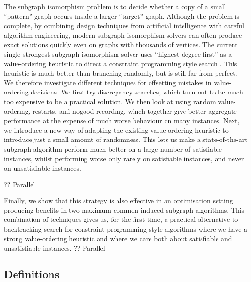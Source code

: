 \documentclass[runningheads]{llncs}
\newcommand{\neighbourhood}{\operatorname{N}}
\newcommand{\vertexset}{\operatorname{V}}
\newcommand{\citet}[2]{#1\cite{#2}}
\begin{document}
The subgraph isomorphism problem is to decide whether a copy of a small ``pattern'' graph occurs
inside a larger ``target'' graph. Although the problem is \NP-complete, by combining design techniques from
artificial intelligence with careful algorithm engineering, modern subgraph isomorphism solvers can
often produce exact solutions quickly even on graphs with thousands of vertices. The current single
strongest subgraph isomorphism solver uses ``highest degree first'' as a value-ordering heuristic to
direct a constraint programming style search
\cite{DBLP:conf/cp/McCreeshP15,DBLP:conf/lion/KotthoffMS16,DBLP:journals/jair/McCreeshPST18}. This
heuristic is much better than branching randomly, but is still far from perfect. We therefore
investigate different techniques for offsetting mistakes in value-ordering decisions. We first try
discrepancy searches, which turn out to be much too expensive to be a practical solution. We then
look at using random value-ordering, restarts, and nogood recording, which together give better
aggregate performance at the expense of much worse behaviour on many instances. Next, we introduce a
new way of adapting the existing value-ordering heuristic to introduce just a small amount of
randomness.  This lets us make a state-of-the-art subgraph algorithm perform much better
on a large number of satisfiable instances, whilst performing worse only rarely on satisfiable
instances, and never on unsatisfiable instances.

?? Parallel

Finally, we show that this strategy is also effective in an optimisation setting, producing benefits
in two maximum common induced subgraph algorithms. This combination of techniques gives us, for the
first time, a practical alternative to backtracking search for constraint programming style
algorithms where we have a strong value-ordering heuristic and where we care both about satisfiable
and unsatisfiable instances. ?? Parallel

\subsection{Definitions}

\end{document}
